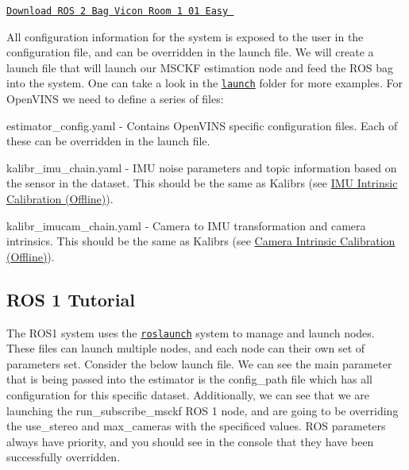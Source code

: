  \href{https://drive.google.com/drive/folders/1xQ1KcZhZ5pioPXTyrZBN6Mjxkfpcd_B3?usp=sharing}{\tt Download R\+OS 2 Bag Vicon Room 1 01 Easy  } 

All configuration information for the system is exposed to the user in the configuration file, and can be overridden in the launch file. We will create a launch file that will launch our M\+S\+C\+KF estimation node and feed the R\+OS bag into the system. One can take a look in the \href{https://github.com/rpng/open_vins/tree/master/ov_msckf/launch}{\tt launch} folder for more examples. For Open\+V\+I\+NS we need to define a series of files\+:


\begin{DoxyItemize}
\item {\ttfamily estimator\+\_\+config.\+yaml} -\/ Contains Open\+V\+I\+NS specific configuration files. Each of these can be overridden in the launch file.
\item {\ttfamily kalibr\+\_\+imu\+\_\+chain.\+yaml} -\/ I\+MU noise parameters and topic information based on the sensor in the dataset. This should be the same as Kalibr\textquotesingle{}s (see \hyperlink{gs-calibration_gs-calib-imu-static}{I\+MU Intrinsic Calibration (Offline)}).
\item {\ttfamily kalibr\+\_\+imucam\+\_\+chain.\+yaml} -\/ Camera to I\+MU transformation and camera intrinsics. This should be the same as Kalibr\textquotesingle{}s (see \hyperlink{gs-calibration_gs-calib-cam-static}{Camera Intrinsic Calibration (Offline)}).
\end{DoxyItemize}\hypertarget{gs-tutorial_gs-tutorial-ros1}{}\subsection{R\+O\+S 1 Tutorial}\label{gs-tutorial_gs-tutorial-ros1}
The R\+O\+S1 system uses the \href{http://wiki.ros.org/roslaunch}{\tt roslaunch} system to manage and launch nodes. These files can launch multiple nodes, and each node can their own set of parameters set. Consider the below launch file. We can see the main parameter that is being passed into the estimator is the {\ttfamily config\+\_\+path} file which has all configuration for this specific dataset. Additionally, we can see that we are launching the {\ttfamily run\+\_\+subscribe\+\_\+msckf} R\+OS 1 node, and are going to be overriding the {\ttfamily use\+\_\+stereo} and {\ttfamily max\+\_\+cameras} with the specificed values. R\+OS parameters always have priority, and you should see in the console that they have been successfully overridden.

